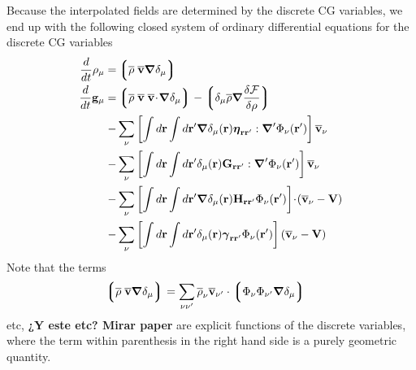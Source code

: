 \documentclass[b5paper,openright,11pt]{book}
\newcommand{\esc}{\!\cdot\!}
\newcommand{\Note}[1]{{\bf \color{red}#1}}    %
\newcommand{\llg}{\left\lgroup}
\newcommand{\rlg}{\right\rgroup}
\begin{document}
Because  the interpolated  fields are  determined by  the discrete  CG
variables,  we end  up with  the following  closed system  of ordinary
differential equations for the discrete CG variables
\begin{align}
\frac{d}{dt}\rho_\mu=&  \llg\overline{\rho} \; \overline{\bf v}\boldsymbol{\nabla}\delta_\mu \rlg
\nonumber\\
\frac{d}{dt}{\bf g}_\mu=&
\llg\overline{\rho}\; \overline{\bf v}\;\overline{\bf v}\esc\boldsymbol{\nabla}\delta_{\mu}\rlg
-\llg\delta_{\mu}\overline{\rho}\boldsymbol{\nabla}\frac{\delta{\cal F}}{\delta\rho}\rlg
\nonumber\\
-& \sum_\nu\left[
\int d{\bf r}\int d{\bf r}'
\boldsymbol{\nabla}\delta_{\mu}({\bf r})
\boldsymbol{\eta}_{{\bf r}{\bf r}'}:
{\boldsymbol{\nabla}^\prime} \Phi_\nu({\bf r}')\right]\overline{\bf v}_\nu
\nonumber\\
-& 
 \sum_\nu\left[\int d{\bf r}\int d{\bf r}'
\delta_{\mu}({\bf r}){\bf G}_{{\bf r}{\bf r}'}:{\boldsymbol{\nabla}^\prime}\Phi_\nu({\bf r}')\right]
\overline{\bf v}_\nu
\nonumber\\
-& 
 \sum_\nu\left[\int d{\bf r}\int d{\bf r}'
\boldsymbol{\nabla}\delta_{\mu}({\bf r})
{\bf H}_{{\bf r}{\bf r}'}\Phi_\nu({\bf r}')\right]
\esc(\overline{\bf v}_\nu-{\bf V})
\nonumber\\
-&
 \sum_\nu\left[\int d{\bf r}\int d{\bf r}'
\delta_{\mu}({\bf r})\boldsymbol{\gamma}_{{\bf r}{\bf r}'}\Phi_\nu({\bf r}')\right](\overline{\bf v}_\nu-{\bf V})
\label{fulldeltapsi}
\end{align}
Note that the terms
\begin{align}
  \llg \overline{\rho} \; \overline{\bf v}\boldsymbol{\nabla}\delta_\mu\rlg
&= \sum_{\nu\nu'}\overline{\rho}_{\nu}\overline{\bf v}_{\nu'} \cdot\llg\Phi_{\nu}\Phi_{\nu'}\boldsymbol{\nabla}\delta_{\mu}\rlg
\end{align}
etc, \Note{¿Y este etc? Mirar paper} are  explicit  functions of  the discrete  variables, where  the term
within  parenthesis in  the  right  hand side  is  a purely  geometric
quantity.
\end{document}
